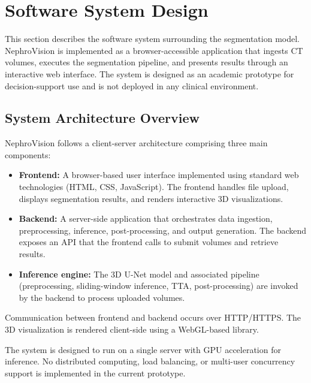 \section{Software System Design}

This section describes the software system surrounding the segmentation model. NephroVision is implemented as a browser-accessible application that ingests CT volumes, executes the segmentation pipeline, and presents results through an interactive web interface. The system is designed as an academic prototype for decision-support use and is not deployed in any clinical environment.

\subsection{System Architecture Overview}

NephroVision follows a client-server architecture comprising three main components:

\begin{itemize}
    \item \textbf{Frontend:} A browser-based user interface implemented using standard web technologies (HTML, CSS, JavaScript). The frontend handles file upload, displays segmentation results, and renders interactive 3D visualizations. %
    \item \textbf{Backend:} A server-side application that orchestrates data ingestion, preprocessing, inference, post-processing, and output generation. The backend exposes an API that the frontend calls to submit volumes and retrieve results. %
    \item \textbf{Inference engine:} The 3D U-Net model and associated pipeline (preprocessing, sliding-window inference, TTA, post-processing) are invoked by the backend to process uploaded volumes.
\end{itemize}

Communication between frontend and backend occurs over HTTP/HTTPS. The 3D visualization is rendered client-side using a WebGL-based library. %

The system is designed to run on a single server with GPU acceleration for inference. No distributed computing, load balancing, or multi-user concurrency support is implemented in the current prototype.

